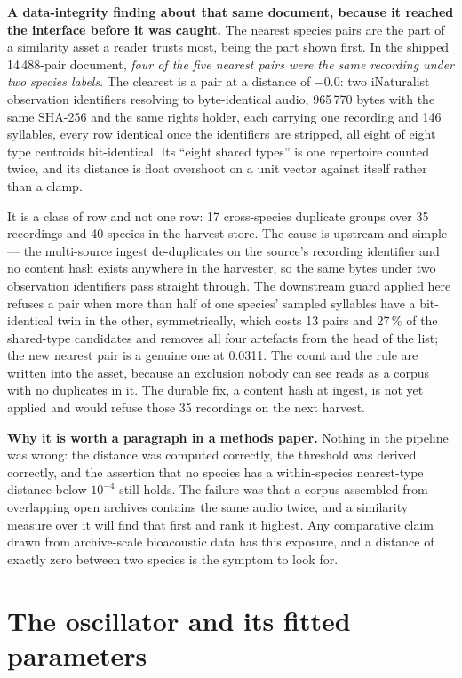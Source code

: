 \documentclass[10pt,twocolumn,a4paper]{article}
\begin{document}
\textbf{A data-integrity finding about that same document, because it reached the interface
before it was caught.} The nearest species pairs are the part of a similarity asset a reader
trusts most, being the part shown first. In the shipped 14\,488-pair document, \emph{four of
the five nearest pairs were the same recording under two species labels}. The clearest is a
pair at a distance of $-0.0$: two iNaturalist observation identifiers resolving to
byte-identical audio, 965\,770 bytes with the same SHA-256 and the same rights holder, each
carrying one recording and 146 syllables, every row identical once the identifiers are
stripped, all eight of eight type centroids bit-identical. Its ``eight shared types'' is one
repertoire counted twice, and its distance is float overshoot on a unit vector against
itself rather than a clamp.

It is a class of row and not one row: 17 cross-species duplicate groups over 35 recordings
and 40 species in the harvest store. The cause is upstream and simple --- the multi-source
ingest de-duplicates on the source's recording identifier and no content hash exists
anywhere in the harvester, so the same bytes under two observation identifiers pass straight
through. The downstream guard applied here refuses a pair when more than half of one
species' sampled syllables have a bit-identical twin in the other, symmetrically, which
costs 13 pairs and 27\,\% of the shared-type candidates and removes all four artefacts from
the head of the list; the new nearest pair is a genuine one at 0.0311. The count and the
rule are written into the asset, because an exclusion nobody can see reads as a corpus with
no duplicates in it. The durable fix, a content hash at ingest, is not yet applied and would
refuse those 35 recordings on the next harvest.

\textbf{Why it is worth a paragraph in a methods paper.} Nothing in the pipeline was wrong:
the distance was computed correctly, the threshold was derived correctly, and the assertion
that no species has a within-species nearest-type distance below $10^{-4}$ still holds. The
failure was that a corpus assembled from overlapping open archives contains the same audio
twice, and a similarity measure over it will find that first and rank it highest. Any
comparative claim drawn from archive-scale bioacoustic data has this exposure, and a
distance of exactly zero between two species is the symptom to look for.

\section{The oscillator and its fitted parameters}
\label{app:model}
\end{document}
